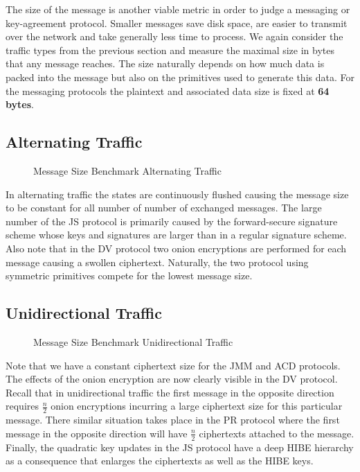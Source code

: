 \documentclass[11pt,a4paper,twoside,openright,bibliography=totoc]{scrbook}
\begin{document}
The size of the message is another viable metric in order to
judge a messaging or key-agreement protocol. Smaller messages save disk space,
are easier to transmit over the network and take generally
less time to process. We again consider the traffic
types from the previous section and measure the maximal
size in bytes that any message reaches. The size
naturally depends on how much data is packed into the message
but also on the primitives used to generate this data.
For the messaging protocols the plaintext and associated
data size is fixed at \textbf{64 bytes}.

\clearpage

\subsection{Alternating Traffic}
\label{sec:alternating-traffic-1}

\begin{figure}[H]
  \centering
   
  \caption{Message Size Benchmark Alternating Traffic}
  \label{fig:msg-size}
\end{figure}

In alternating traffic the states are continuously flushed causing the
message size to be constant for all number of number
of exchanged messages. The large number of the JS protocol
is primarily caused by the forward-secure signature scheme
whose keys and signatures are larger than in a regular signature scheme.
Also note that in the DV protocol two onion encryptions
are performed for each message causing a swollen
ciphertext. Naturally, the two protocol using
symmetric primitives compete for the lowest message size.

\subsection{Unidirectional Traffic}
\label{sec:unid-traff-1}

\begin{figure}[H]
  \centering
   
  \caption{Message Size Benchmark Unidirectional Traffic}
  \label{fig:msg-size-uni}
\end{figure}

Note that we have a constant ciphertext size for the JMM and ACD
protocols.
The effects of the onion encryption are now clearly visible
in the DV protocol. Recall that in unidirectional traffic
the first message in the opposite direction requires $\frac{n}{2}$
onion encryptions incurring a large ciphertext size for
this particular message.
There similar situation takes place in the PR protocol where
the first message in the opposite direction
will have $\frac{n}{2}$ ciphertexts attached to the message.
Finally, the quadratic key updates in the JS protocol
have a deep HIBE hierarchy as a consequence that
enlarges the ciphertexts as well as the HIBE
keys.
\end{document}
